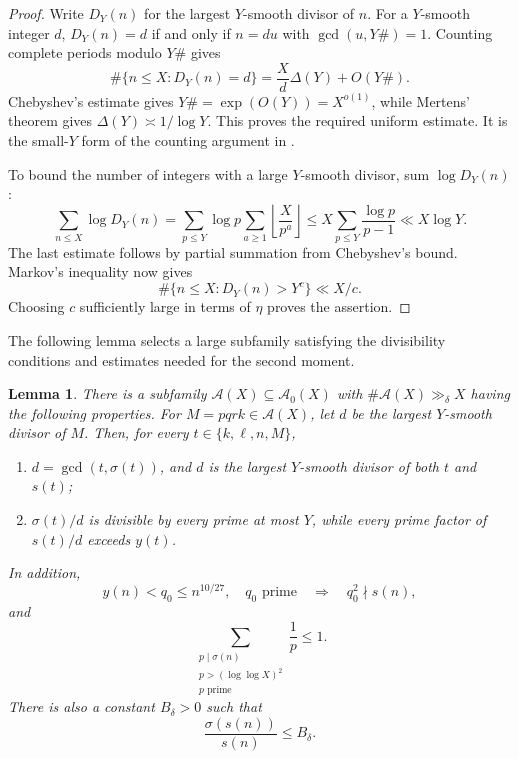 \documentclass[11pt,letterpaper,reqno]{amsart}
\numberwithin{equation}{section}
\newtheorem{lemma}[theorem]{Lemma}
\theoremstyle{remark}
\renewcommand{\leq}{\leqslant}
\renewcommand{\geq}{\geqslant}
\begin{document}
\begin{proof}
Write $D_Y(n)$ for the largest $Y$-smooth divisor of $n$. For a
$Y$-smooth integer $d$,
$D_Y(n)=d$ if and only if $n=du$ with $\gcd(u,Y\#)=1$. Counting complete
periods modulo $Y\#$ gives
\[
 \#\{n\leq X:D_Y(n)=d\}
 =\frac Xd\Delta(Y)+O(Y\#).
\]
Chebyshev's estimate gives $Y\#=\exp(O(Y))=X^{o(1)}$, while Mertens'
theorem gives $\Delta(Y)\asymp1/\log Y$. This proves the required
uniform estimate. It is the small-$Y$ form of the counting argument
in \cite[(3.1)]{LucaPomerance}.

To bound the number of integers with a large $Y$-smooth divisor, sum $\log D_Y(n)$:
\[
 \sum_{n\leq X}\log D_Y(n)
 =\sum_{p\leq Y}\log p\sum_{a\geq1}
 \left\lfloor\frac X{p^a}\right\rfloor
 \leq X\sum_{p\leq Y}\frac{\log p}{p-1}
 \ll X\log Y.
\]
The last estimate follows by partial summation from Chebyshev's bound.
Markov's inequality now gives
\[
 \#\{n\leq X:D_Y(n)>Y^c\}\ll X/c.
\]
Choosing $c$ sufficiently large in terms of $\eta$ proves the assertion.
\end{proof}

The following lemma selects a large subfamily satisfying the divisibility
conditions and estimates needed for the second moment.

\begin{lemma}\label{lem:sv-regular}
There is a subfamily $\mathcal{A}(X)\subseteq\mathcal{A}_0(X)$ with
$\#\mathcal{A}(X)\gg_\delta X$ having the following properties. For
$M=pqrk\in\mathcal{A}(X)$, let $d$ be the largest $Y$-smooth divisor of
$M$. Then, for every $t\in\{k,\ell,n,M\}$,
\begin{enumerate}
\item $d=\gcd(t,\sigma(t))$, and $d$ is the largest $Y$-smooth divisor of
 both $t$ and $s(t)$;
\item $\sigma(t)/d$ is divisible by every prime at most $Y$, while every
 prime factor of $s(t)/d$ exceeds $y(t)$.
\end{enumerate}
In addition,
\[
 y(n)<q_0\leq n^{10/27},\quad q_0\text{ prime}
 \quad\Longrightarrow\quad q_0^2\nmid s(n),
\]
and
\begin{equation}\label{eq:sv-LP25}
 \sum_{\substack{p\mid\sigma(n)\\p>(\log\log X)^2\\p\text{ prime}}}\frac1p\leq1.
\end{equation}
There is also a constant $B_\delta>0$ such that
\begin{equation}\label{eq:sv-image-abundancy}
 \frac{\sigma(s(n))}{s(n)}\leq B_\delta.
\end{equation}
\end{lemma}
\end{document}
